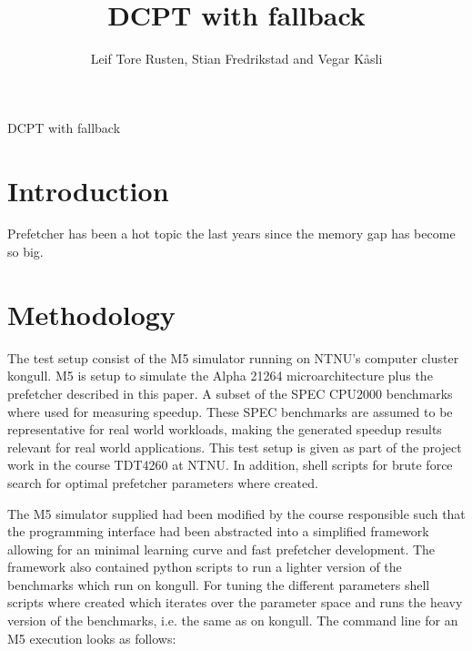 \documentclass[12pt,journal,compsoc]{IEEEtran}
\begin{document}
\title{DCPT with fallback}
\author{Leif Tore Rusten,
        Stian Fredrikstad and
        Vegar K\aa sli}

%
{DCPT with fallback}


\maketitle
\IEEEdisplaynotcompsoctitleabstractindextext
\IEEEpeerreviewmaketitle

\section{Introduction}
Prefetcher has been a hot topic the last years since the memory gap has become so big.

\section{Methodology}
The test setup consist of the M5 simulator running on NTNU's computer
cluster kongull. M5 is setup to simulate the Alpha 21264 microarchitecture
plus the prefetcher described in this paper. A subset of the SPEC CPU2000
benchmarks where used for measuring speedup. These SPEC benchmarks are assumed
to be representative for real world workloads, making the generated speedup
results relevant for real world applications. This test setup is given
as part of the project work in the course TDT4260 at NTNU. In addition,
shell scripts for brute force search for optimal prefetcher parameters
where created.

The M5 simulator supplied had been modified by the course responsible such
that the programming interface had been abstracted into a simplified framework
allowing for an minimal learning curve and fast prefetcher development. The
framework also contained python scripts to run a lighter version of the
benchmarks which run on kongull. For tuning the different parameters shell
scripts where created which iterates over the parameter space and runs the
heavy version of the benchmarks, i.e. the same as on kongull. The command line
for an M5 execution looks as follows:
\end{document}
